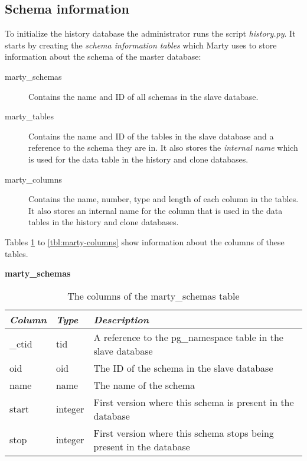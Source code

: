 \subsection{Schema information}
To initialize the history database the administrator runs the script \textit{history.py}.
It starts by creating the \textit{schema information tables} which Marty uses to store information about the schema of the master database:

\begin{description}
  \item[marty\_schemas]
    Contains the name and ID of all schemas in the slave database.
  \item[marty\_tables]
    Contains the name and ID of the tables in the slave database and a reference to the schema they are in.
    It also stores the \textit{internal name} which is used for the data table in the history and clone databases.
  \item[marty\_columns]
    Contains the name, number, type and length of each column in the tables.
    It also stores an internal name for the column that is used in the data tables in the history and clone databases.
\end{description}

Tables \ref{tbl:marty-schemas} to \ref{tbl:marty-columns} show information about the columns of these tables.

\begin{table}[h]
  \centering
  \textbf{marty\_schemas}
  \begin{tabularx}{\textwidth}{llX}
    \textit{Column} & \textit{Type} & \textit{Description} \\
    \midrule
    \_ctid & tid & A reference to the pg\_namespace table in the slave database \\
    oid & oid & The ID of the schema in the slave database \\
    name & name & The name of the schema \\
    start & integer & First version where this schema is present in the database \\
    stop & integer & First version where this schema stops being present in the database \\
  \end{tabularx}
  \caption{The columns of the marty\_schemas table}
  \label{tbl:marty-schemas}
\end{table}

